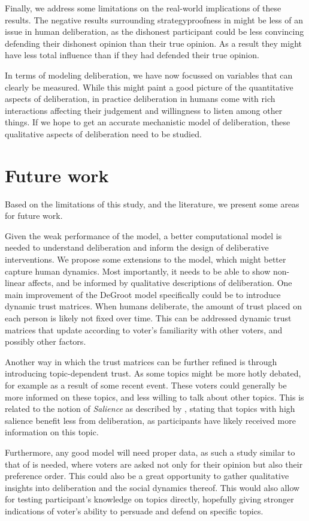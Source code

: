 Finally, we address some limitations on the real-world implications of these results.
The negative results surrounding strategyproofness in  might be less
of an issue in human deliberation, as the dishonest participant could be less convincing
defending their dishonest opinion than their true opinion. As a result they might have less
total influence than if they had defended their true opinion.

In terms of modeling deliberation, we have now focussed on variables that can
clearly be measured. While this might paint a good picture of the quantitative
aspects of deliberation, in practice deliberation in humans come with rich interactions
affecting their judgement and willingness to listen among other things. If we hope to
get an accurate mechanistic model of deliberation, these qualitative aspects of deliberation
need to be studied.




\section{Future work}

Based on the limitations of this study, and the literature, we present some areas for future work.

Given the weak performance of the model, a better computational model is needed
to understand deliberation and inform the design of deliberative interventions.
We propose some extensions to the model, which might better capture human
dynamics. Most importantly, it needs to be able to show non-linear affects, and
be informed by qualitative descriptions of deliberation. One main improvement of the DeGroot model specifically could be to introduce dynamic trust matrices.
When humans deliberate, the amount of trust placed on each person is likely not
fixed over time. This can be addressed dynamic trust matrices that update according
to voter's familiarity with other voters, and possibly other factors.

Another way in which the trust matrices can be further refined is through
introducing topic-dependent trust. As some topics might be more hotly debated,
for example as a result of some recent event. These voters could generally be
more informed on these topics, and less willing to talk about other topics.
This is related to the notion of \textit{Salience} as described by
\citet{listDeliberationSinglePeakednessPossibility2013}, stating that topics
with high salience benefit less from deliberation, as participants have likely
received more information on this topic.

Furthermore, any good model will need proper data, as such a study similar to
that of \citet{fishkinCanDeliberationHave2024} is needed, where voters are
asked not only for their opinion but also their preference order. This could
also be a great opportunity to gather qualitative insights into deliberation
and the social dynamics thereof. This would also allow for testing participant's
knowledge on topics directly, hopefully giving stronger indications of voter's ability
to persuade and defend on specific topics.

